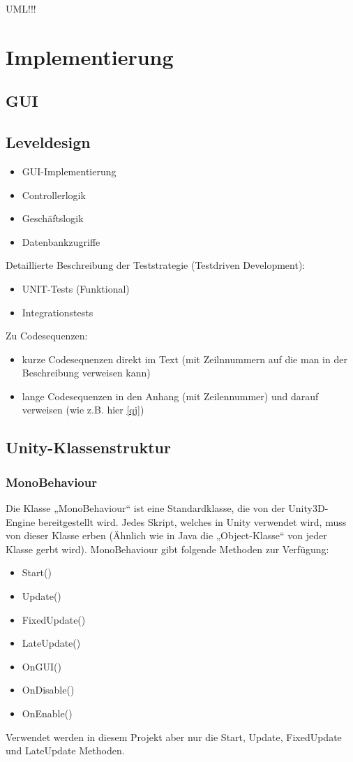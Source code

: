 UML!!!

\chapter{Implementierung}
\section{GUI}
\section{Leveldesign}

\begin{itemize}
	\item GUI-Implementierung
	\item Controllerlogik
	\item Geschäftslogik
	\item Datenbankzugriffe
\end{itemize}

Detaillierte Beschreibung der Teststrategie (Testdriven Development):

\begin{itemize}
	\item UNIT-Tests (Funktional)
	\item Integrationstests
\end{itemize}

Zu Codesequenzen:
\begin{itemize}	\item kurze Codesequenzen direkt im Text (mit Zeilnnummern auf die man in der Beschreibung verweisen kann)
	\item lange Codesequenzen in den Anhang (mit Zeilennummer) und darauf verweisen (wie z.B. hier \cref{qj})
\end{itemize}

\section{Unity-Klassenstruktur}
\subsection{MonoBehaviour}	
Die Klasse „MonoBehaviour“ ist eine Standardklasse, die von der Unity3D-Engine bereitgestellt wird. Jedes Skript, welches in Unity verwendet wird, muss von dieser Klasse erben (Ähnlich wie in Java die „Object-Klasse“ von jeder Klasse gerbt wird). MonoBehaviour gibt folgende Methoden zur Verfügung:
\begin{itemize}
	\item Start()
	\item Update()
	\item FixedUpdate()
	\item LateUpdate()
	\item OnGUI()
	\item OnDisable()
	\item OnEnable()
\end{itemize}
Verwendet werden in diesem Projekt aber nur die Start, Update, FixedUpdate und LateUpdate Methoden.
